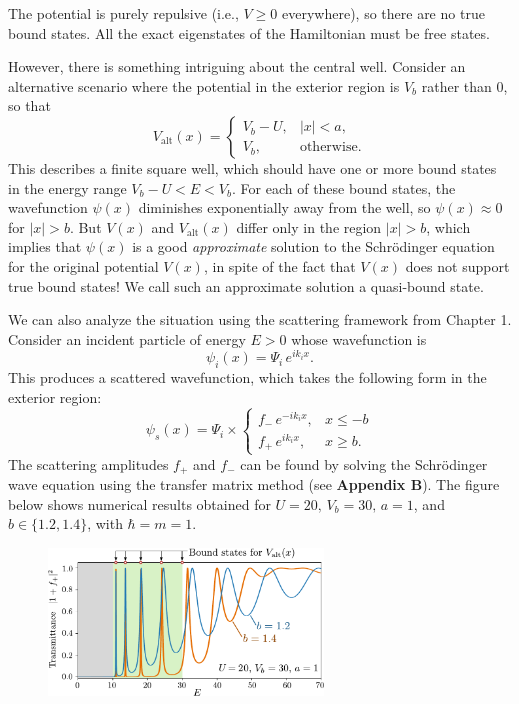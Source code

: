 \documentclass[pra,12pt]{revtex4}
\begin{document}
\noindent
The potential is purely repulsive (i.e., $V \ge 0$ everywhere), so
there are no true bound states.  All the exact eigenstates of the
Hamiltonian must be free states.

However, there is something intriguing about the central well.
Consider an alternative scenario where the potential in the exterior
region is $V_b$ rather than $0$, so that
\begin{equation}
  V_{\mathrm{alt}}(x) = \begin{cases}V_b - U, & |x| < a, \\ V_b, & \mathrm{otherwise}.\end{cases}
\end{equation}
This describes a finite square well, which should have one or more
bound states in the energy range $V_b-U < E < V_b$.  For each of these
bound states, the wavefunction $\psi(x)$ diminishes exponentially away
from the well, so $\psi(x) \approx 0$ for $|x| > b$.  But $V(x)$ and
$V_{\mathrm{alt}}(x)$ differ only in the region $|x| > b$, which
implies that $\psi(x)$ is a good \textit{approximate} solution to the
Schr\"odinger equation for the original potential $V(x)$, in spite of
the fact that $V(x)$ does not support true bound states!  We call such
an approximate solution a quasi-bound state.

We can also analyze the situation using the scattering framework from
Chapter 1.  Consider an incident particle of energy $E > 0$ whose
wavefunction is
\begin{equation}
  \psi_i(x) = \Psi_i \, e^{ik_i x}.
\end{equation}
This produces a scattered wavefunction, which takes the following form
in the exterior region:
\begin{equation}
  \psi_s(x) = \Psi_i \times \begin{cases}f_- \,e^{-ik_ix}, & x \le -b \\ f_+ \,e^{ik_ix}, & x \ge b.\end{cases}
\end{equation}
The scattering amplitudes $f_+$ and $f_-$ can be found by solving the
Schr\"odinger wave equation using the transfer matrix method (see
\textbf{Appendix B}).  The figure below shows numerical results
obtained for $U = 20,\,V_b = 30,\,a=1$, and $b \in \{ 1.2, 1.4\}$,
with $\hbar = m = 1$.

\begin{figure}[h]
  \centering\includegraphics[width=0.65\textwidth]{resonances}
\end{figure}
\end{document}
